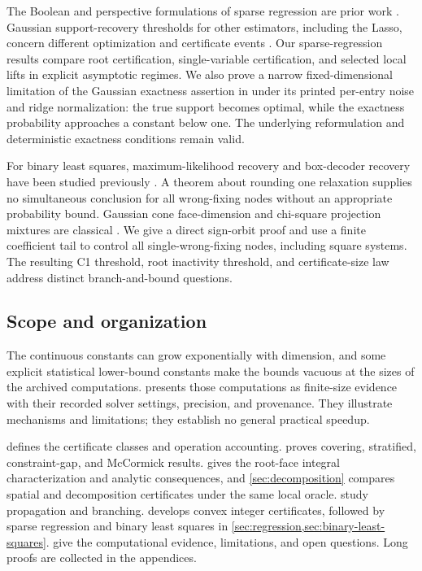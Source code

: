 The Boolean and perspective formulations of sparse regression are prior
work
\citep{pilanciWainwrightElGhaoui2015BooleanRelaxation,xieDeng2018BooleanRelaxation,dongChenLinderoth2015SparseRegression}.
Gaussian support-recovery thresholds for other estimators, including the
Lasso, concern different optimization and certificate events
\citep{wainwright2009SharpLassoThresholds}. Our sparse-regression results
compare root certification, single-variable certification, and selected
local lifts in explicit asymptotic regimes. We also prove a narrow
fixed-dimensional limitation of the Gaussian exactness assertion in
\citet[Theorem~2]{pilanciWainwrightElGhaoui2015BooleanRelaxation} under its
printed per-entry noise and ridge normalization: the true support becomes
optimal, while the exactness probability approaches a constant below one.
The underlying reformulation and deterministic exactness conditions remain
valid.

For binary least squares, maximum-likelihood recovery and box-decoder
recovery have been studied previously
\citep{hansenHassibiDimakisXu2009NearOptimalDetection,huLu2020LimitingPoissonMIMO}.
A theorem about rounding one relaxation supplies no simultaneous conclusion
for all wrong-fixing nodes without an appropriate probability bound.
Gaussian cone face-dimension and chi-square projection mixtures are
classical
\citep{hugSchneider2016RandomConicalTessellations,mccoyTropp2014SteinerFormulas}.
We give a direct sign-orbit proof and use a finite coefficient tail to control
all single-wrong-fixing nodes, including square systems. The resulting C1
threshold, root inactivity threshold, and certificate-size law address
distinct branch-and-bound questions.

\subsection{Scope and organization}\label{intro:scope}

The continuous constants can grow exponentially with dimension, and some
explicit statistical lower-bound constants make the bounds vacuous at the
sizes of the archived computations.  presents those
computations as finite-size evidence with their recorded solver settings,
precision, and provenance. They illustrate mechanisms and limitations;
they establish no general practical speedup.

 defines the certificate classes and operation
accounting.  proves covering, stratified, constraint-gap,
and McCormick results.  gives the root-face integral
characterization and analytic consequences, and \cref{sec:decomposition}
compares spatial and decomposition certificates under the same local
oracle.  study propagation and branching.
 develops convex integer certificates, followed by sparse
regression and binary least squares in
\cref{sec:regression,sec:binary-least-squares}.
 give the computational evidence,
limitations, and open questions. Long proofs are collected in the
appendices.
